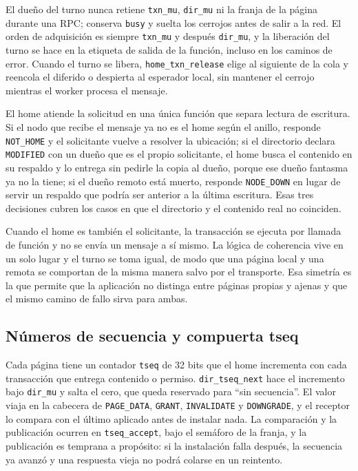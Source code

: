 El dueño del turno nunca retiene \texttt{txn\_mu}, \texttt{dir\_mu} ni la franja de la página durante una RPC; conserva \texttt{busy} y suelta los cerrojos antes de salir a la red. El orden de adquisición es siempre \texttt{txn\_mu} y después \texttt{dir\_mu}, y la liberación del turno se hace en la etiqueta de salida de la función, incluso en los caminos de error. Cuando el turno se libera, \texttt{home\_txn\_release} elige al siguiente de la cola y reencola el diferido o despierta al esperador local, sin mantener el cerrojo mientras el worker procesa el mensaje.

El home atiende la solicitud en una única función que separa lectura de escritura. Si el nodo que recibe el mensaje ya no es el home según el anillo, responde \texttt{NOT\_HOME} y el solicitante vuelve a resolver la ubicación; si el directorio declara \texttt{MODIFIED} con un dueño que es el propio solicitante, el home busca el contenido en su respaldo y lo entrega sin pedirle la copia al dueño, porque ese dueño fantasma ya no la tiene; si el dueño remoto está muerto, responde \texttt{NODE\_DOWN} en lugar de servir un respaldo que podría ser anterior a la última escritura. Esas tres decisiones cubren los casos en que el directorio y el contenido real no coinciden.

Cuando el home es también el solicitante, la transacción se ejecuta por llamada de función y no se envía un mensaje a sí mismo. La lógica de coherencia vive en un solo lugar y el turno se toma igual, de modo que una página local y una remota se comportan de la misma manera salvo por el transporte. Esa simetría es la que permite que la aplicación no distinga entre páginas propias y ajenas y que el mismo camino de fallo sirva para ambas.

\subsection{Números de secuencia y compuerta tseq}\label{sec:msi-tseq}

Cada página tiene un contador \texttt{tseq} de 32 bits que el home incrementa con cada transacción que entrega contenido o permiso. \texttt{dir\_tseq\_next} hace el incremento bajo \texttt{dir\_mu} y salta el cero, que queda reservado para ``sin secuencia''. El valor viaja en la cabecera de \texttt{PAGE\_DATA}, \texttt{GRANT}, \texttt{INVALIDATE} y \texttt{DOWNGRADE}, y el receptor lo compara con el último aplicado antes de instalar nada. La comparación y la publicación ocurren en \texttt{tseq\_accept}, bajo el semáforo de la franja, y la publicación es temprana a propósito: si la instalación falla después, la secuencia ya avanzó y una respuesta vieja no podrá colarse en un reintento.

